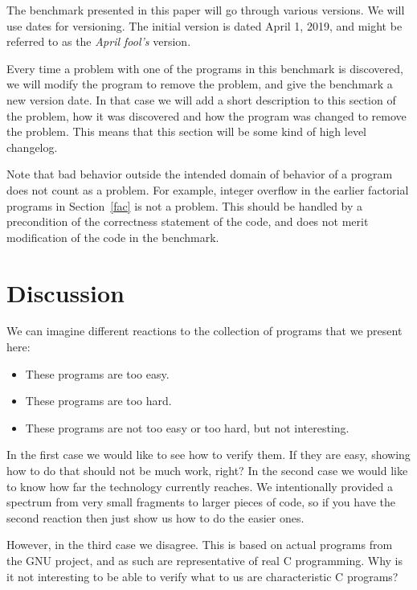\documentclass{article}
\begin{document}
The benchmark presented in this paper will go through various versions.
We will use dates for versioning.
The initial version is dated April 1, 2019, and might be
referred to as the \emph{April fool's} version.

Every time a problem with one of the programs in this
benchmark is discovered, we will modify the program to remove the problem, and give
the benchmark a new version date.
In that case we will add a short description to this section of the problem, how it was discovered and how the program was changed to remove the problem.
This means that this section will be some kind of high level changelog.

Note that bad behavior outside the
intended domain of behavior of a program does not count as a problem.
For example, integer overflow in the earlier factorial programs in Section~\ref{fac}
is not a problem.
This should be handled by a precondition of the correctness statement of the code, and
does not merit modification of the code in the benchmark.

\section{Discussion}
We can imagine different reactions to the collection of programs that we present here:
\begin{itemize}
\item
These programs are too easy.

\item
These programs are too hard.

\item
These programs are not too easy or too hard, but not interesting.

\end{itemize}
\noindent
In the first case we would like to see how to verify them.
If they are easy, showing how to do that should not be much work, right?
In the second case we would like to know how far the technology
currently reaches.
We intentionally provided a spectrum from very small fragments
to larger pieces of code, so if you have the second reaction then just show us how to do the easier ones.

However, in the third case we disagree.
This is based on actual programs from the GNU project,
and as such are representative of real C programming.
Why is it not interesting to be able to verify what
to us are characteristic C programs?
\end{document}
